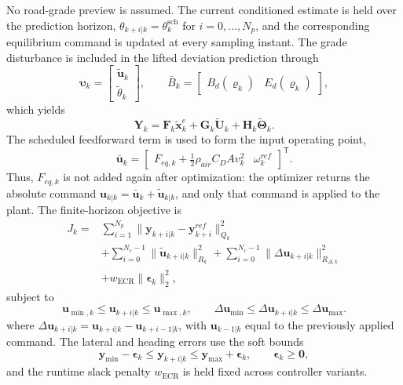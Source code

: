 \documentclass{ieeeaccess}
\begin{document}
No road-grade preview is assumed. The current conditioned estimate is held over the prediction horizon, $\theta_{k+i|k}=\theta_k^{\mathrm{sch}}$ for $i=0,\ldots,N_p$, and the corresponding equilibrium command is updated at every sampling instant. The grade disturbance is included in the lifted deviation prediction through
\begin{equation}
\bm\upsilon_k=
\begin{bmatrix}\widetilde{\bm u}_k\\\widetilde\theta_k\end{bmatrix},
\qquad
\bar B_k=
\begin{bmatrix}B_d(\boldsymbol\varrho_k)&E_d(\boldsymbol\varrho_k)\end{bmatrix},
\label{eq:augmented_prediction_model}
\end{equation}
which yields
\begin{equation}
\bm Y_k=\bm F_k\widetilde{\bm x}^e_k
+\bm G_k\widetilde{\bm U}_k
+\bm H_k\widetilde{\bm\Theta}_k .
\label{eq:lifted_prediction}
\end{equation}
The scheduled feedforward term is used to form the input operating point,
\begin{equation}
\bar{\bm u}_k=
\begin{bmatrix}
F_{eq,k}+\tfrac12\rho_{air}C_DA v_k^2 & \omega_k^{ref}
\end{bmatrix}^{\mathsf T}.
\label{eq:online_input_operating_point}
\end{equation}
Thus, $F_{eq,k}$ is not added again after optimization: the optimizer returns the absolute command $\bm u_{k|k}=\bar{\bm u}_k+\widetilde{\bm u}_{k|k}$, and only that command is applied to the plant. The finite-horizon objective is
\begin{equation}
\begin{aligned}
J_k={}&\sum_{i=1}^{N_p}
\|\bm y_{k+i|k}-\bm y^{ref}_{k+i}\|_{Q_k}^{2}\\
&+\sum_{i=0}^{N_c-1}\|\widetilde{\bm u}_{k+i|k}\|_{R_k}^{2}
+\sum_{i=0}^{N_c-1}
\|\Delta\bm u_{k+i|k}\|_{R_{\Delta,k}}^{2}\\
&+w_{\mathrm{ECR}}\|\bm\epsilon_k\|_2^2,
\end{aligned}
\label{eq:mpc_cost}
\end{equation}
subject to
\begin{equation}
\bm u_{\min,k}\leq\bm u_{k+i|k}\leq\bm u_{\max,k},
\qquad
\Delta\bm u_{\min}\leq\Delta\bm u_{k+i|k}
\leq\Delta\bm u_{\max}.
\label{eq:input_constraint}
\end{equation}
where $\Delta\bm u_{k+i|k}=\bm u_{k+i|k}-\bm u_{k+i-1|k}$, with $\bm u_{k-1|k}$ equal to the previously applied command. The lateral and heading errors use the soft bounds
\begin{equation}
\bm y_{\min}-\bm\epsilon_k\leq\bm y_{k+i|k}
\leq\bm y_{\max}+\bm\epsilon_k,
\qquad \bm\epsilon_k\geq\bm0,
\label{eq:soft_output_constraint}
\end{equation}
and the runtime slack penalty $w_{\mathrm{ECR}}$ is held fixed across controller variants.
\end{document}
